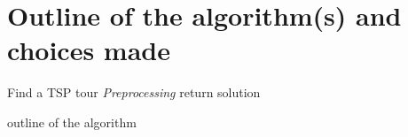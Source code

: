 \documentclass[a4paper]{article}
\begin{document}
%
%
%
%
%
%
%
%
%
%
%
%
%
%
%
%
%
%
%
%

\section{Outline of the algorithm(s) and choices made}
\begin{algorithm}
	Find a TSP tour\;
	\textit{\*\* Preprocessing\*\*}\;
  return solution\;
 \caption{outline of the algorithm}
\end{algorithm}
\end{document}
